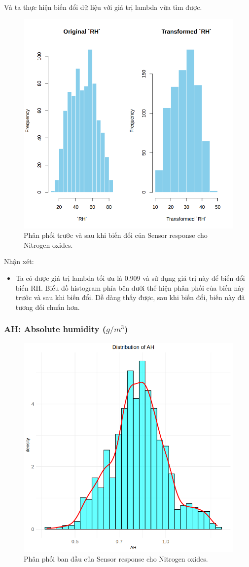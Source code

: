 Và ta thực hiện biến đổi dữ liệu với giá trị lambda vừa tìm được.
\begin{figure}[H]
    \centering
    \includegraphics[width=0.75\columnwidth]{air_figures/RH_transformed_distribution.png}
    \caption{Phân phối trước và sau khi biến đổi của Sensor response cho Nitrogen oxides.}
    \label{fig:rh_transformed_distribution}
\end{figure}
Nhận xét:
\begin{itemize}
    \item Ta có được giá trị lambda tối ưu là 0.909 và sử dụng giá trị này để biến đổi biến RH. Biểu đồ histogram phía bên dưới thể hiện phân phối của biến này trước và sau khi biến đổi. Dễ dàng thấy được, sau khi biến đổi, biến này đã tương đối chuẩn hơn.
\end{itemize}

\subsubsection{AH: Absolute humidity ($g/m^3$)}

\begin{figure}[H]
    \centering
    \includegraphics[width=0.75\columnwidth]{air_figures/AH_original_distribution.png}
    \caption{Phân phối ban đầu của Sensor response cho Nitrogen oxides.}
    \label{fig:ah_original_distribution}
\end{figure}

